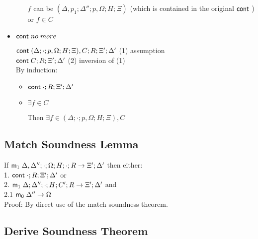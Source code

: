 \begin{itemize}
\begin{itemize}
      $f$ can be $(\Delta, p_1; \Delta''; p, \Omega; H; \Xi)$ (which is contained in the original $\mathsf{cont} \;$)\\
      or $f \in C$\\
      
   \end{itemize}
   
   \item $\mathsf{cont} \; no \; more$
   
   $\mathsf{cont} \; (\Delta; \cdot; p, \Omega; H; \Xi), C; R; \Xi'; \Delta'$ \hfill (1) assumption \\
   $\mathsf{cont} \; C; R; \Xi'; \Delta'$ \hfill (2) inversion of (1) \\
   
   By induction:
   
   \begin{itemize}
      \item $\mathsf{cont} \; \cdot; R; \Xi'; \Delta'$
      
      \item $\exists f \in C$
      
      Then $\exists f \in (\Delta; \cdot; p, \Omega; H; \Xi), C$ \\
   \end{itemize}
   
\end{itemize}

\subsection{Match Soundness Lemma}

If $\mathsf{m}_1 \; \Delta, \Delta''; \cdot; \Omega; H; \cdot; R \rightarrow \Xi'; \Delta'$ then either:\\
1. \hspace{1cm} $\mathsf{cont} \; \cdot; R; \Xi'; \Delta'$ or \\
2. \hspace{1cm} $\mathsf{m}_1 \; \Delta; \Delta''; \cdot; H; C'; R \rightarrow \Xi'; \Delta'$ and\\
2.1 \hspace{2cm} $\mathsf{m}_0 \; \Delta'' \rightarrow \Omega$\\

Proof: By direct use of the match soundness theorem.

\subsection{Derive Soundness Theorem}

